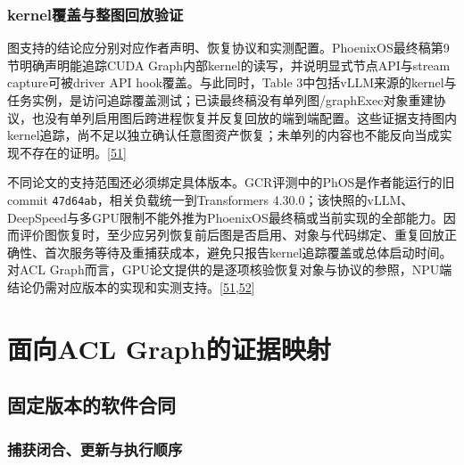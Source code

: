 \documentclass[
  UTF8,
  zihao=5]{ctexart}
\begin{document}
\hypertarget{kernelux8986ux76d6ux4e0eux6574ux56feux56deux653eux9a8cux8bc1}{%
\subsubsection{kernel覆盖与整图回放验证}\label{kernelux8986ux76d6ux4e0eux6574ux56feux56deux653eux9a8cux8bc1}}

图支持的结论应分别对应作者声明、恢复协议和实测配置。PhoenixOS最终稿第9节明确声明能追踪CUDA
Graph内部kernel的读写，并说明显式节点API与stream capture可被driver API
hook覆盖。与此同时，Table
3中包括vLLM来源的kernel与任务实例，是访问追踪覆盖测试；已读最终稿没有单列图/graphExec对象重建协议，也没有单列启用图后跨进程恢复并反复回放的端到端配置。这些证据支持图内kernel追踪，尚不足以独立确认任意图资产恢复；未单列的内容也不能反向当成实现不存在的证明。{[}\protect\hyperlink{ref-wei2025phoenixos}{51}{]}

不同论文的支持范围还必须绑定具体版本。GCR评测中的PhOS是作者能运行的旧commit
\texttt{47d64ab}，相关负载统一到Transformers
4.30.0；该快照的vLLM、DeepSpeed与多GPU限制不能外推为PhoenixOS最终稿或当前实现的全部能力。因而评价图恢复时，至少应另列恢复前后图是否启用、对象与代码绑定、重复回放正确性、首次服务等待及重捕获成本，避免只报告kernel追踪覆盖或总体启动时间。对ACL
Graph而言，GPU论文提供的是逐项核验恢复对象与协议的参照，NPU端结论仍需对应版本的实现和实测支持。{[}\protect\hyperlink{ref-wei2025phoenixos}{51},\protect\hyperlink{ref-zeng2026gcr}{52}{]}

\hypertarget{ux9762ux5411acl-graphux7684ux8bc1ux636eux6620ux5c04}{%
\section{面向ACL
Graph的证据映射}\label{ux9762ux5411acl-graphux7684ux8bc1ux636eux6620ux5c04}}

\hypertarget{ux56faux5b9aux7248ux672cux7684ux8f6fux4ef6ux5408ux540c}{%
\subsection{固定版本的软件合同}\label{ux56faux5b9aux7248ux672cux7684ux8f6fux4ef6ux5408ux540c}}

\hypertarget{ux6355ux83b7ux95edux5408ux66f4ux65b0ux4e0eux6267ux884cux987aux5e8f}{%
\subsubsection{捕获闭合、更新与执行顺序}\label{ux6355ux83b7ux95edux5408ux66f4ux65b0ux4e0eux6267ux884cux987aux5e8f}}
\end{document}
